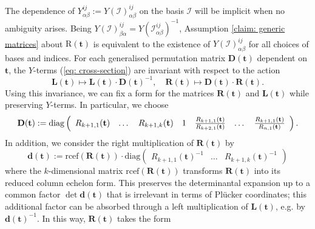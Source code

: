 \documentclass[10pt]{article}
\theoremstyle{remark}%
\theoremstyle{definition}%
\begin{document}
The dependence of $Y_{\alpha\beta}^{ij}:=Y(\mathcal{I})_{\alpha\beta}^{ij}$ on the basis $\mathcal{I}$ will be implicit when no ambiguity arises. Being $Y(\mathcal{I})_{\beta\alpha}^{ij}=Y(\mathcal{I}_{\alpha\beta}^{ij})^{-1}$, Assumption \ref{claim: generic matrices} about $\mathrm{R}(\mathbf{t})$ is equivalent to the existence of $Y(\mathcal{I})_{\alpha\beta}^{ij}$ for all choices of bases and indices. 
For each generalised permutation matrix $\mathbf{D}(\mathbf{t})$ dependent on $\mathbf{t}$, the $Y$-terms (\ref{eq: cross-section}) are invariant with respect to the action  
 \begin{equation}
\mathbf{L}(\mathbf{t})\mapsto\mathbf{L}(\mathbf{t})\cdot\mathbf{D}(\mathbf{t})^{-1},\quad\mathbf{R}(\mathbf{t})\mapsto\mathbf{D}(\mathbf{t})\cdot\mathbf{R}(\mathbf{t}).
\label{eq: generalized permutation matrix gauge}
 \end{equation}
Using this invariance, we can fix a form for the matrices $\mathbf{R}(\mathbf{t})$ and $\mathbf{L}(\mathbf{t})$ while preserving $Y$-terms.
In particular, we choose   
 \begin{equation}
\mathbf{D}(\mathbf{t}):=\mathrm{diag}\left(\begin{array}{c
cccccc}
R_{k+1,1}(\mathbf{t}) 
& \dots & R_{k+1,k}(\mathbf{t}) & 1 & \frac{R_{k+1,1}(\mathbf{t})}{R_{k+2,1}(\mathbf{t})} & \dots & \frac{R_{k+1,1}(\mathbf{t})}{R_{n,1}(\mathbf{t})}\end{array}\right).
\label{eq: special gauge, diagonal, n}
 \end{equation}
In addition, we consider the right multiplication of $\mathbf{R}(\mathbf{t})$ by 
 \begin{equation}
\mathbf{d}(\mathbf{t}):=\text{rcef}(\mathbf{R}(\mathbf{t}))\cdot \mathrm{diag}\left(\begin{array}{cccc}
R_{k+1,1}(\mathbf{t})^{-1} & %
\dots & R_{k+1,k}(\mathbf{t})^{-1} \end{array}\right)\label{eq: special gauge, diagonal, k}
 \end{equation}
where the $k$-dimensional matrix $\text{rcef}(\mathbf{R}(\mathbf{t}))$ transforms $\mathbf{R}(\mathbf{t})$ into its reduced column echelon form. This preserves the determinantal expansion up to a common factor $\det\mathbf{d}(\mathbf{t})$ that is irrelevant in terms of Pl\"{u}cker coordinates; this additional factor can be absorbed through a left multiplication of $\mathbf{L}(\mathbf{t})$, e.g. by $\mathbf{d}(\mathbf{t})^{-1}$. In this way, $\mathbf{R}(\mathbf{t})$ takes the form 
\end{document}
